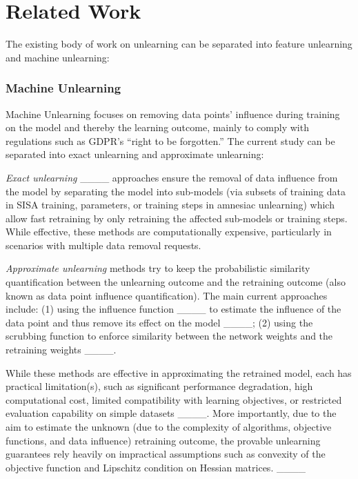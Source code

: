 \section{Related Work}
\label{s:related_work}

The existing body of work on unlearning can be separated into feature unlearning and machine unlearning:

\subsubsection{Machine Unlearning}

Machine Unlearning focuses on removing data points' influence during training on the model and thereby the learning outcome, mainly to comply with regulations such as GDPR’s “right to be forgotten.” The current study can be separated into exact unlearning and approximate unlearning:

\textit{Exact unlearning} ____ approaches ensure the removal of data influence from the model by separating the model into sub-models (via subsets of training data in SISA training, parameters, or training steps in amnesiac unlearning) which allow fast retraining by only retraining the affected sub-models or training steps. While effective, these methods are computationally expensive, particularly in scenarios with multiple data removal requests. 

\textit{Approximate unlearning} methods try to keep the probabilistic similarity quantification between the unlearning outcome and the retraining outcome (also known as data point influence quantification). The main current approaches include: (1) using the influence function ____ to estimate the influence of the data point and thus remove its effect on the model ____; (2) using the scrubbing function to enforce similarity between the network weights and the retraining weights ____.

While these methods are effective in approximating the retrained model, each has practical limitation(s), such as significant performance degradation, high computational cost, limited compatibility with learning objectives, or restricted evaluation capability on simple datasets ____. More importantly, due to the aim to estimate the unknown (due to the complexity of algorithms, objective functions, and data influence) retraining outcome, the provable unlearning guarantees rely heavily on impractical assumptions such as convexity of the objective function and Lipschitz condition on Hessian matrices. ____

